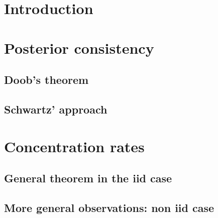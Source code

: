 


\section{Introduction}


\section{Posterior consistency}


\subsection{Doob's theorem}

\subsection{Schwartz' approach}


\section{Concentration rates}


\subsection{General theorem in the iid case}


\subsection{More general observations: non iid case}